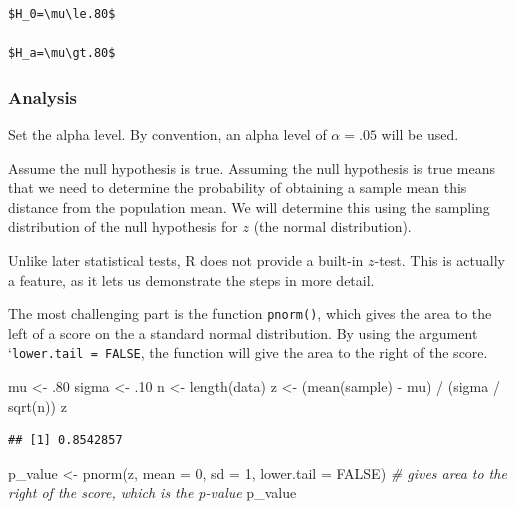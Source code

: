 \documentclass[
]{book}
\newenvironment{Shaded}{\begin{snugshade}}{\end{snugshade}}
\newcommand{\AttributeTok}[1]{\textcolor[rgb]{0.77,0.63,0.00}{#1}}
\newcommand{\CommentTok}[1]{\textcolor[rgb]{0.56,0.35,0.01}{\textit{#1}}}
\newcommand{\ConstantTok}[1]{\textcolor[rgb]{0.00,0.00,0.00}{#1}}
\newcommand{\DecValTok}[1]{\textcolor[rgb]{0.00,0.00,0.81}{#1}}
\newcommand{\FunctionTok}[1]{\textcolor[rgb]{0.00,0.00,0.00}{#1}}
\newcommand{\NormalTok}[1]{#1}
\newcommand{\OtherTok}[1]{\textcolor[rgb]{0.56,0.35,0.01}{#1}}
\newcommand{\SpecialCharTok}[1]{\textcolor[rgb]{0.00,0.00,0.00}{#1}}
\begin{document}
\begin{verbatim}
$H_0=\mu\le.80$

$H_a=\mu\gt.80$
\end{verbatim}

\hypertarget{analysis}{%
\subsubsection{Analysis}\label{analysis}}

Set the alpha level. By convention, an alpha level of \(\alpha = .05\) will be used.

Assume the null hypothesis is true. Assuming the null hypothesis is true means that we need to determine the probability of obtaining a sample mean this distance from the population mean. We will determine this using the sampling distribution of the null hypothesis for \(z\) (the normal distribution).

Unlike later statistical tests, R does not provide a built-in \(z\)-test. This is actually a feature, as it lets us demonstrate the steps in more detail.

The most challenging part is the function \texttt{pnorm()}, which gives the area to the left of a score on the a standard normal distribution. By using the argument `\texttt{lower.tail\ =\ FALSE}, the function will give the area to the right of the score.

\begin{Shaded}
\begin{Highlighting}[]
\NormalTok{mu }\OtherTok{\textless{}{-}}\NormalTok{ .}\DecValTok{80}
\NormalTok{sigma }\OtherTok{\textless{}{-}}\NormalTok{ .}\DecValTok{10}
\NormalTok{n }\OtherTok{\textless{}{-}} \FunctionTok{length}\NormalTok{(data)}
\NormalTok{z }\OtherTok{\textless{}{-}}\NormalTok{ (}\FunctionTok{mean}\NormalTok{(sample) }\SpecialCharTok{{-}}\NormalTok{ mu) }\SpecialCharTok{/}\NormalTok{ (sigma }\SpecialCharTok{/} \FunctionTok{sqrt}\NormalTok{(n))}
\NormalTok{z}
\end{Highlighting}
\end{Shaded}

\begin{verbatim}
## [1] 0.8542857
\end{verbatim}

\begin{Shaded}
\begin{Highlighting}[]
\NormalTok{p\_value }\OtherTok{\textless{}{-}} \FunctionTok{pnorm}\NormalTok{(z, }\AttributeTok{mean =} \DecValTok{0}\NormalTok{, }\AttributeTok{sd =} \DecValTok{1}\NormalTok{, }\AttributeTok{lower.tail =} \ConstantTok{FALSE}\NormalTok{) }\CommentTok{\# gives area to the right of the score, which is the p{-}value}
\NormalTok{p\_value}
\end{Highlighting}
\end{Shaded}
\end{document}
